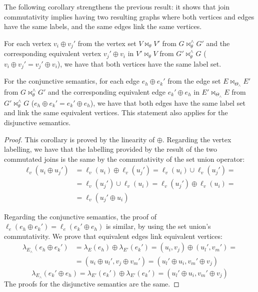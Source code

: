 The following corollary strengthens the previous result: it shows that join commutativity implies
having two resulting graphs where both vertices and edges have the same labels, and the same edges
link the same vertices.

\begin{corollary}\label{coroll:Comm}
	For each vertex $v_i\oplus v_j'$ from the vertex set $V\bowtie_\theta V'$ from
	$G\bowtie_\theta^\wedge G'$ and the corresponding equivalent vertex $v_j'\oplus v_i$ in $V'\bowtie_\theta V$ from
	$G'\bowtie_\theta^\wedge G$ ($v_i\oplus v_j'=v_j'\oplus v_i$), we have that both vertices have the same label set.

	For the conjunctive semantics, for each edge $e_h\oplus e_k'$ from the edge set $E\bowtie_{\Theta_\wedge} E'$ from
	$G\bowtie_\theta^\wedge G'$ and the corresponding equivalent edge $e_k'\oplus e_h$ in $E'\bowtie_{\Theta_\wedge} E$ from
	$G'\bowtie_\theta^\wedge G$ ($e_h\oplus e_k'=e_k'\oplus e_h$), we have that both edges have the same label set and link
	the same equivalent vertices. This statement also applies for the disjunctive semantics.
\end{corollary}
\begin{proof}
	This corollary is proved by the linearity of $\oplus$. Regarding the vertex labelling, we have that the labelling provided by the result of the two commutated joins is the same by the commutativity of the set union operator:
	\[\begin{split}
	\ell_v(u_i\oplus u_j')&=\ell_v(u_i)\oplus \ell_v(u_j')=\ell_v(u_i)\cup\ell_v(u_j')=\\
	&=\ell_v(u_j')\cup\ell_v(u_i)=\ell_v(u_j')\oplus\ell_v(u_i)=\\
	&=\ell_v(u_j'\oplus u_i)
	\end{split}
	\]

	Regarding the conjunctive semantics, the proof of $\ell_e(e_h\oplus e_k')=\ell_e(e_k'\oplus e_h)$ is similar, by using the set union's commutativity. We  prove that equivalent edges link equivalent vertices:
	\[\begin{split}
	\lambda_{E_\wedge}(e_h\oplus e_k')&=\lambda_E(e_h)\oplus\lambda_{E'}(e_k')=(u_i,v_j)\oplus (u_l',v_m')=\\
	&=(u_i\oplus u_l',v_j\oplus v_m')=(u_l'\oplus u_i,v_m'\oplus v_j)
	\end{split}  \]
	\[\lambda_{E_\wedge}(e_k'\oplus e_h)=\lambda_{E'}(e_k')\oplus\lambda_{E'}(e_k')=(u_l'\oplus u_i,v_m'\oplus v_j)  \]
	The proofs for the disjunctive semantics are the same.
\end{proof}

